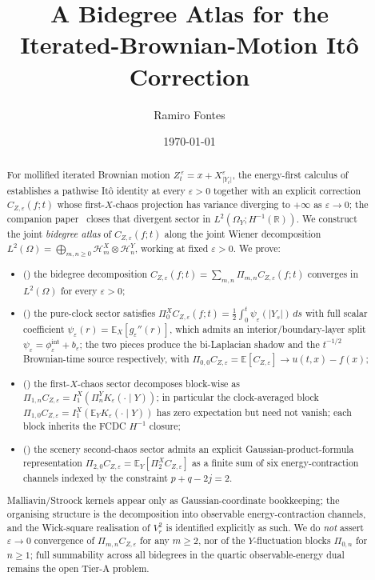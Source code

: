 \documentclass[11pt,reqno]{amsart}
\title{A Bidegree Atlas for the\\
       Iterated-Brownian-Motion It\^o Correction}
\author{Ramiro Fontes}
\date{\today}
\theoremstyle{plain}
\theoremstyle{definition}
\theoremstyle{remark}
\newcommand{\R}{\mathbb{R}}
\newcommand{\E}{\mathbb{E}}
\newcommand{\Hilb}{\mathcal{H}}
\newcommand{\IBM}{Z}
\newcommand{\Pir}{\Pi}
\begin{document}
\begin{abstract}
For mollified iterated Brownian motion
$\IBM_t^{\,\varepsilon}=x+X^{\varepsilon}_{|Y_t|}$, the energy-first
calculus of~\cite{Fontes-EnergyFirst} establishes a pathwise It\^o
identity at every $\varepsilon>0$ together with an explicit correction
$C_{\IBM,\varepsilon}(f;t)$ whose first-$X$-chaos projection has
variance diverging to $+\infty$ as $\varepsilon\to 0$; the companion
paper~\cite{Fontes-FCDC} closes that divergent sector in
$L^{2}(\Omega_Y;H^{-1}(\R))$. We construct the joint
\emph{bidegree atlas} of $C_{\IBM,\varepsilon}(f;t)$ along the
joint Wiener decomposition
$L^{2}(\Omega)=\bigoplus_{m,n\ge 0}\Hilb_m^X\otimes\Hilb_n^Y$,
working at fixed $\varepsilon>0$. We prove:

\begin{itemize}
\item[\textbf{(A)}] () the bidegree decomposition
$C_{\IBM,\varepsilon}(f;t)=\sum_{m,n}\Pir_{m,n}C_{\IBM,\varepsilon}(f;t)$
converges in $L^{2}(\Omega)$ for every $\varepsilon>0$;
\item[\textbf{(B)}] () the pure-clock sector
satisfies
$\Pir_{0}^X C_{\IBM,\varepsilon}(f;t)=\tfrac12\!\int_0^t\psi_\varepsilon(|Y_s|)\,ds$
with full scalar coefficient
$\psi_\varepsilon(r)=\E_X[g_\varepsilon''(r)]$, which admits an
interior/boundary-layer split $\psi_\varepsilon=\phi_\varepsilon^{\mathrm{int}}+b_\varepsilon$;
the two pieces produce the bi-Laplacian shadow and the
$t^{-1/2}$ Brownian-time source respectively, with
$\Pir_{0,0}C_{\IBM,\varepsilon}=\E[C_{\IBM,\varepsilon}]\to u(t,x)-f(x)$;
\item[\textbf{(C)}] () the first-$X$-chaos
sector decomposes block-wise as
$\Pir_{1,n}C_{\IBM,\varepsilon}=I_1^X(\Pir_n^Y K_\varepsilon(\cdot\mid Y))$;
in particular the clock-averaged block
$\Pir_{1,0}C_{\IBM,\varepsilon}=I_1^X(\E_Y K_\varepsilon(\cdot\mid Y))$
has zero expectation but need not vanish; each block inherits the
FCDC $H^{-1}$ closure;
\item[\textbf{(D)}] () the scenery second-chaos sector
admits an explicit Gaussian-product-formula representation
$\Pir_{2,0}C_{\IBM,\varepsilon}=\E_Y[\Pir_2^X C_{\IBM,\varepsilon}]$
as a finite sum of six energy-contraction channels indexed by the
constraint $p+q-2j=2$.
\end{itemize}

Malliavin/Stroock kernels appear only as Gaussian-coordinate
bookkeeping; the organising structure is the decomposition into
observable energy-contraction channels, and the Wick-square
realisation of $V_r^{2}$ is identified explicitly as such. We do
\emph{not} assert $\varepsilon\to 0$ convergence of
$\Pir_{m,n}C_{\IBM,\varepsilon}$ for any $m\ge 2$, nor of the
$Y$-fluctuation blocks $\Pir_{0,n}$ for $n\ge 1$; full summability
across all bidegrees in the quartic observable-energy dual remains
the open Tier-A problem.
\end{abstract}
\end{document}
